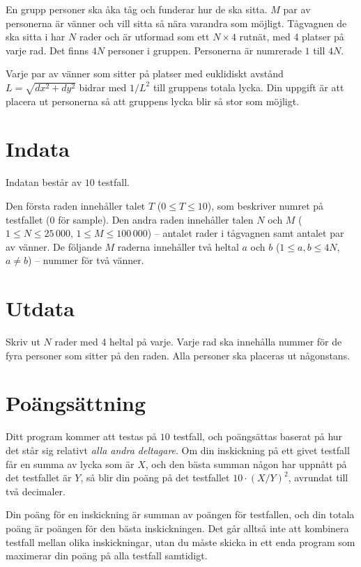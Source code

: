 En grupp personer ska åka tåg och funderar hur de ska sitta.
$M$ par av personerna är vänner och vill sitta så nära varandra som möjligt.
Tågvagnen de ska sitta i har $N$ rader och är utformad som ett $N \times 4$ rutnät, med 4 platser på varje rad.
Det finns $4N$ personer i gruppen.
Personerna är numrerade $1$ till $4N$.

Varje par av vänner som sitter på platser med euklidiskt avstånd $L = \sqrt{dx^2 + dy^2}$
bidrar med $1/L^2$ till gruppens totala lycka.
Din uppgift är att placera ut personerna så att gruppens lycka blir så stor som möjligt.

\section*{Indata}
Indatan består av $10$ testfall.

Den första raden innehåller talet $T$ ($0 \le T \le 10$), som beskriver numret på testfallet ($0$ för sample).
Den andra raden innehåller talen $N$ och $M$ ($1 \le N \le 25\,000$, $1 \le M \le 100\,000$) -- antalet rader i tågvagnen samt antalet par av vänner.
De följande $M$ raderna innehåller två heltal $a$ och $b$ ($1 \le a,b \le 4N$, $a \ne b$) -- nummer för två vänner.

\section*{Utdata}
Skriv ut $N$ rader med 4 heltal på varje.
Varje rad ska innehålla nummer för de fyra personer som sitter på den raden.
Alla personer ska placeras ut någonstans.

\section*{Poängsättning}
Ditt program kommer att testas på $10$ testfall, och poängsättas baserat på hur det står sig relativt \emph{alla andra deltagare}.
Om din inskickning på ett givet testfall får en summa av lycka som är $X$, och den bästa summan någon har uppnått på det testfallet är $Y$,
så blir din poäng på det testfallet $10 \cdot (X / Y)^2$, avrundat till två decimaler.

Din poäng för en inskickning är summan av poängen för testfallen, och din totala poäng är poängen för den bästa inskickningen.
Det går alltså inte att kombinera testfall mellan olika inskickningar, utan du måste skicka in ett enda program som
maximerar din poäng på alla testfall samtidigt.

